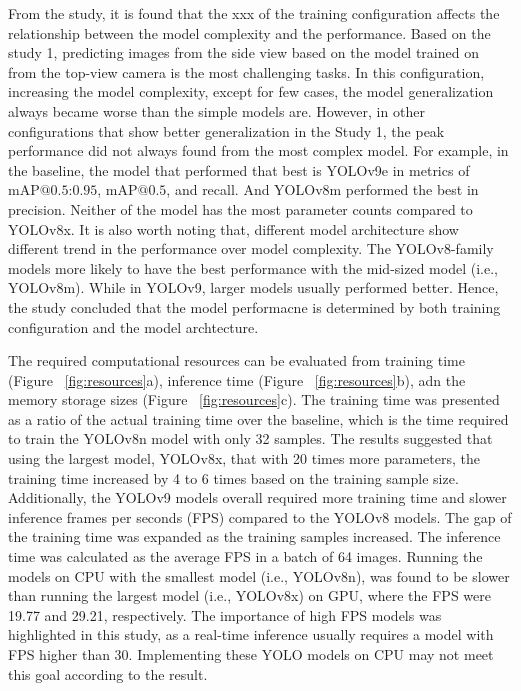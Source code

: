 From the study, it is found that the xxx of the training configuration affects the relationship between the model complexity and the performance. Based on the study 1, predicting images from the side view based on the model trained on from the top-view camera is the most challenging tasks. In this configuration, increasing the model complexity, except for few cases, the model generalization always became worse than the simple models are. However, in other configurations that show better generalization in the Study 1, the peak performance did not always found from the most complex model. For example, in the baseline, the model that performed that best is YOLOv9e in metrics of $\text{mAP@{0.5:0.95}}$, $\text{mAP@{0.5}}$, and recall. And YOLOv8m performed the best in precision. Neither of the model has the most parameter counts compared to YOLOv8x. It is also worth noting that, different model architecture show different trend in the performance over model complexity. The YOLOv8-family models more likely to have the best performance with the mid-sized model (i.e., YOLOv8m). While in YOLOv9, larger models usually performed better. Hence, the study concluded that the model performacne is determined by both training configuration and the model archtecture.

The required computational resources can be evaluated from training time (Figure ~\ref{fig:resources}a), inference time (Figure ~\ref{fig:resources}b), adn the memory storage sizes (Figure ~\ref{fig:resources}c). The training time was presented as a ratio of the actual training time over the baseline, which is the time required to train the YOLOv8n model with only 32 samples. The results suggested that using the largest model, YOLOv8x, that with 20 times more parameters, the training time increased by 4 to 6 times based on the training sample size. Additionally, the YOLOv9 models overall required more training time and slower inference frames per seconds (FPS) compared to the YOLOv8 models. The gap of the training time was expanded as the training samples increased. The inference time was calculated as the average FPS in a batch of 64 images. Running the models on CPU with the smallest model (i.e., YOLOv8n), was found to be slower than running the largest model (i.e., YOLOv8x) on GPU, where the FPS were 19.77 and 29.21, respectively. The importance of high FPS models was highlighted in this study, as a real-time inference usually requires a model with FPS higher than 30. Implementing these YOLO models on CPU may not meet this goal according to the result.



